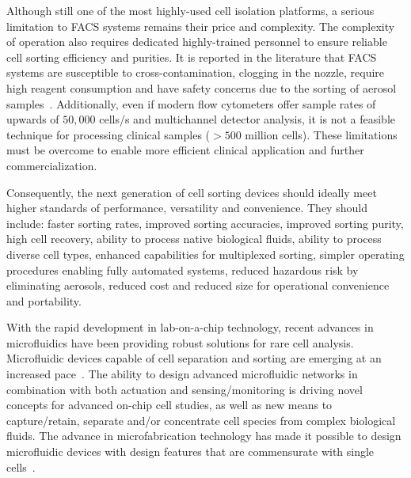 Although still one of the most highly-used cell isolation platforms, a serious limitation to FACS systems remains their price and complexity. The complexity of operation also requires dedicated highly-trained personnel to ensure reliable cell sorting efficiency and purities. It is reported in the literature that FACS systems are susceptible to cross-contamination, clogging in the nozzle, require high reagent consumption and have safety concerns due to the sorting of aerosol samples~\cite{Holmes2014}. Additionally, even if modern flow cytometers offer sample rates of upwards of $50,000$ cells/s and multichannel detector analysis, it is not a feasible technique for processing clinical samples ($>500$ million cells). These limitations must be overcome to enable more efficient clinical application and further commercialization.

Consequently, the next generation of cell sorting devices should ideally meet higher standards of performance, versatility and convenience. They should include: faster sorting rates, improved sorting accuracies, improved sorting purity, high cell recovery, ability to process native biological fluids, ability to process diverse cell types, enhanced capabilities for multiplexed sorting, simpler operating procedures enabling fully automated systems, reduced hazardous risk by eliminating aerosols, reduced cost and reduced size for operational convenience and portability.

With the rapid development in lab-on-a-chip technology, recent advances in microfluidics have been providing robust solutions for rare cell analysis. Microfluidic devices capable of cell separation and sorting are emerging at an increased pace~\cite{El-Ali2006}. The ability to design advanced microfluidic networks in combination with both actuation and sensing/monitoring is driving novel concepts for advanced on-chip cell studies, as well as new means to capture/retain, separate and/or concentrate cell species from complex biological fluids. The advance in microfabrication technology has made it possible to design microfluidic devices with design features that are commensurate with single cells~\cite{Sackmann2014}.

